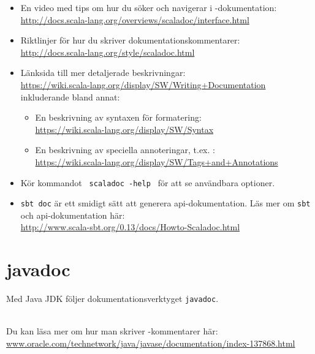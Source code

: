 \begin{itemize}[leftmargin=*]

\item En video med tips om hur du söker och navigerar i \scaladoc-dokumentation: 
\\
\url{http://docs.scala-lang.org/overviews/scaladoc/interface.html}

\item
Riktlinjer för hur du skriver dokumentationskommentarer: \\
\url{http://docs.scala-lang.org/style/scaladoc.html}

\item Länksida till mer detaljerade beskrivningar: \\
\url{https://wiki.scala-lang.org/display/SW/Writing+Documentation} \\
inkluderande bland annat:

\begin{itemize}[nolistsep]
\item En beskrivning av syntaxen för formatering: \\
\url{https://wiki.scala-lang.org/display/SW/Syntax} 

\item En beskrivning av speciella annoteringar, t.ex. : \\
\url{https://wiki.scala-lang.org/display/SW/Tags+and+Annotations} 

\end{itemize}

\item Kör kommandot \texttt{ scaladoc -help } för att se användbara optioner.

\item \texttt{sbt doc} är ett smidigt sätt att generera api-dokumentation. Läs mer om \texttt{sbt} och api-dokumentation här: \\
\url{http://www.scala-sbt.org/0.13/docs/Howto-Scaladoc.html}


\end{itemize}

\clearpage

\section{javadoc}
\newcommand{\javadoc}{\texttt{javadoc}}

Med Java JDK följer dokumentationsverktyget \javadoc.

\TODO \\

Du kan läsa mer om hur man skriver -kommentarer här:\\
\href{http://www.oracle.com/technetwork/java/javase/documentation/index-137868.html}{www.oracle.com/technetwork/java/javase/documentation/index-137868.html}

